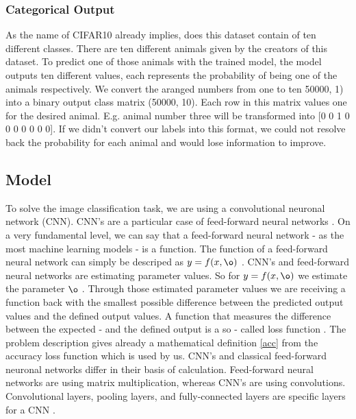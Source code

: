\documentclass[journal]{IEEEtran}
\begin{document}
\subsubsection{Categorical Output}
\noindent As the name of CIFAR10 already implies, does this dataset contain of ten different classes. There are ten different animals given by the creators of this dataset. To predict one of those animals with the trained model, the model outputs ten different values, each represents the probability of being one of the animals respectively. 
We convert the aranged numbers from one to ten 50000, 1) into a binary output class matrix (50000, 10). Each row in this matrix values one for the desired animal. E.g. animal number three will be transformed into [0 0 1 0 0 0 0 0 0 0].
If we didn't convert our labels into this format, we could not resolve back the probability for each animal and would lose information to improve. \\

\subsection{Model}
\noindent To solve the image classification task, we are using a convolutional neuronal network (CNN). CNN's are a particular case of feed-forward neural networks \cite{Goodfellow-et-al-2016}. On a very fundamental level, we can say that a feed-forward neural network - as the most machine learning models - is a function. The function of a feed-forward neural network can simply be descriped as \(y = f(x, \o )\) . CNN's and feed-forward neural networks are estimating parameter values. So for \(y = f(x, \o )\) we estimate the parameter \(\o \) \cite{Goodfellow-et-al-2016}. Through those estimated parameter values we are receiving a function back with the smallest possible difference between the predicted output values and the defined output values. A function that measures the difference between the expected - and the defined output is a so - called loss function \cite{Goodfellow-et-al-2016}. The problem description gives already a mathematical definition \eqref{acc} from the accuracy loss function which is used by us. 
CNN's and classical feed-forward neuronal networks differ in their basis of calculation. Feed-forward neural networks are using matrix multiplication, whereas CNN's are using convolutions. Convolutional layers, pooling layers, and fully-connected layers are specific layers for a CNN \cite{LeCun1998}. \\
\end{document}
